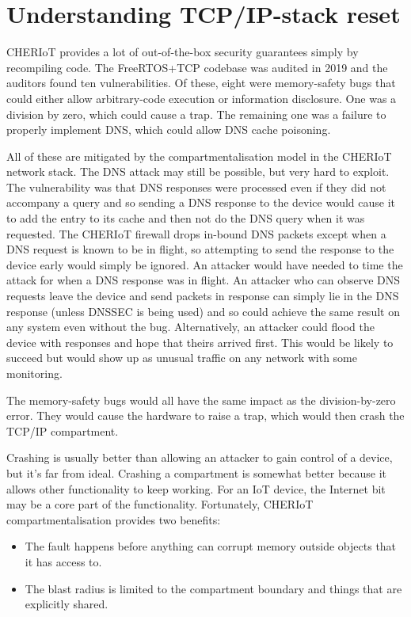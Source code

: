 \section[label=netreset]{Understanding TCP/IP-stack reset}

CHERIoT provides a lot of out-of-the-box security guarantees simply by recompiling code.
The FreeRTOS+TCP codebase was audited in 2019 and the auditors found ten vulnerabilities.
Of these, eight were memory-safety bugs that could either allow arbitrary-code execution or information disclosure.
One was a division by zero, which could cause a trap.
The remaining one was a failure to properly implement DNS, which could allow DNS cache poisoning.

All of these are mitigated by the compartmentalisation model in the CHERIoT network stack.
The DNS attack may still be possible, but very hard to exploit.
The vulnerability was that DNS responses were processed even if they did not accompany a query and so sending a DNS response to the device would cause it to add the entry to its cache and then not do the DNS query when it was requested.
The CHERIoT firewall drops in-bound DNS packets except when a DNS request is known to be in flight, so attempting to send the response to the device early would simply be ignored.
An attacker would have needed to time the attack for when a DNS response was in flight.
An attacker who can observe DNS requests leave the device and send packets in response can simply lie in the DNS response (unless DNSSEC is being used) and so could achieve the same result on any system even without the bug.
Alternatively, an attacker could flood the device with responses and hope that theirs arrived first.
This would be likely to succeed but would show up as unusual traffic on any network with some monitoring.

The memory-safety bugs would all have the same impact as the division-by-zero error.
They would cause the hardware to raise a trap, which would then crash the TCP/IP compartment.

Crashing is usually better than allowing an attacker to gain control of a device, but it's far from ideal.
Crashing a compartment is somewhat better because it allows other functionality to keep working.
For an IoT device, the Internet bit may be a core part of the functionality.
Fortunately, CHERIoT compartmentalisation provides two benefits:

\begin{itemize}
	\item{The fault happens before anything can corrupt memory outside objects that it has access to.}
	\item{The blast radius is limited to the compartment boundary and things that are explicitly shared.}
\end{itemize}

